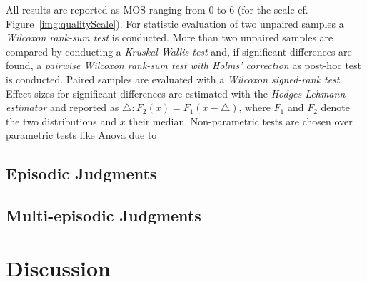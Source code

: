 All results are reported as \ac{MOS} ranging from 0 to 6 (for the scale cf. Figure~\ref{img:qualityScale}).
For statistic evaluation of two unpaired samples a \emph{Wilcoxon rank-sum test} is conducted.
More than two unpaired samples are compared by conducting a \emph{Kruskal-Wallis test} and, if significant differences are found, a \emph{pairwise Wilcoxon rank-sum test with Holms' correction} as post-hoc test is conducted.
Paired samples are evaluated with a \emph{Wilcoxon signed-rank test}.
Effect sizes for significant differences are estimated with the \emph{Hodges-Lehmann estimator} and reported as $\triangle: F_{2}(x)=F_{1}(x-\triangle)$, where
$F_{1}$ and $F_{2}$ denote the two distributions and $x$ their median.
Non-parametric tests are chosen over parametric tests like Anova due to 


\subsection{Episodic Judgments} 

\subsection{Multi-episodic Judgments}

\section{Discussion}
